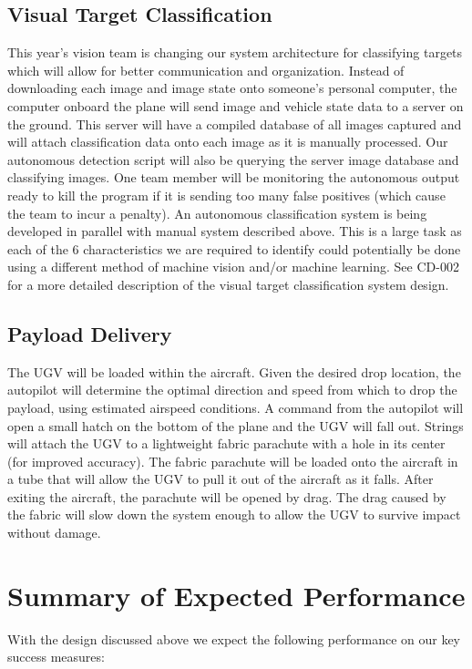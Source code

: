 \documentclass{auvsi_doc}
\begin{document}
\subsection{Visual Target Classification}
This year's vision team is changing our system architecture for classifying targets which will allow for better communication and organization. Instead of downloading each image and image state onto someone's personal computer, the computer onboard the plane will send image and vehicle state data to a server on the ground. This server will have a compiled database of all images captured and will attach classification data onto each image as it is manually processed. Our autonomous detection script will also be querying the server image database and classifying
images. One team member will be monitoring the autonomous output ready to kill the
program if it is sending too many false positives (which cause the team to incur a
penalty). An autonomous classification system is being developed in parallel with manual system described above. This is a large task as each of the 6 characteristics we are required to identify could potentially be done using a different method of machine vision and/or machine learning. See CD-002 for a more detailed description of the visual target classification system design.
\subsection{Payload Delivery}
The UGV will be loaded within the aircraft. Given the desired drop location, the autopilot will determine the optimal direction and speed from which to drop the payload, using estimated airspeed conditions. A command from the autopilot will open a small hatch on the bottom of the plane and the UGV will fall out. Strings will attach the UGV to a lightweight fabric parachute with a hole in its center (for improved accuracy). The fabric parachute will be loaded onto the aircraft in a tube that will allow the UGV to pull it out of the aircraft as it falls. After exiting the aircraft, the parachute will be opened by drag. The drag caused by the fabric will slow down the system enough to allow the UGV to survive impact without damage.

\section{Summary of Expected Performance}

With the design discussed above we expect the following performance on our key success measures:
\end{document}
